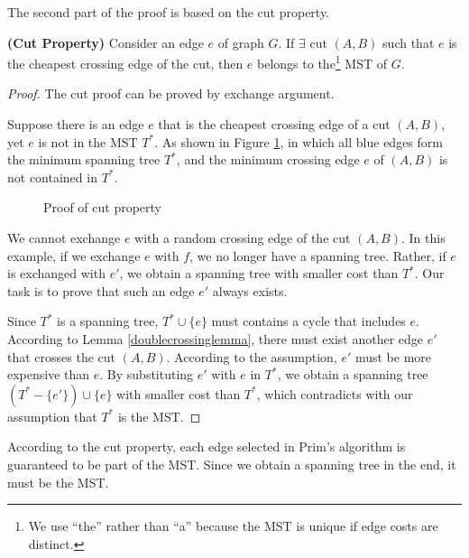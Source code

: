 The second part of the proof is based on the cut property.
\begin{theorem}
\textbf{(Cut Property)}
Consider an edge $e$ of graph $G$. If $\exists$ cut $(A,B)$ such that $e$ is the cheapest crossing edge of the cut, then $e$ belongs to the\footnote{We use ``the'' rather than ``a'' because the MST is unique if edge costs are distinct.} MST of $G$.
\end{theorem}
\begin{proof}
The cut proof can be proved by exchange argument.

Suppose there is an edge $e$ that is the cheapest crossing edge of a cut $(A,B)$, yet $e$ is not in the MST $T^*$. As shown in Figure \ref{proofcutproperty}, in which all blue edges form the minimum spanning tree $T^*$, and the minimum crossing edge $e$ of $(A,B)$ is not contained in $T^*$.
\begin{figure}[ht]
\centering
{}
\caption{Proof of cut property}\label{proofcutproperty}
\end{figure}

We cannot exchange $e$ with a random crossing edge of the cut $(A,B)$. In this example, if we exchange $e$ with $f$, we no longer have a spanning tree. Rather, if $e$ is exchanged with $e'$, we obtain a spanning tree with smaller cost than $T^*$. Our task is to prove that such an edge $e'$ always exists. 

Since $T^*$ is a spanning tree, $T^*\cup\{e\}$ must contains a cycle that includes $e$. According to Lemma \ref{doublecrossinglemma}, there must exist another edge $e'$ that crosses the cut $(A,B)$. According to the assumption, $e'$ must be more expensive than $e$. By substituting $e'$ with $e$ in $T^*$, we obtain a spanning tree $(T^*-\{e'\})\cup\{e\}$ with smaller cost than $T^*$, which contradicts with our assumption that $T^*$ is the MST.
\end{proof}

According to the cut property, each edge selected in Prim's algorithm is guaranteed to be part of the MST. Since we obtain a spanning tree in the end, it must be the MST. 
\ifx\PREAMBLE\undefined

\fi